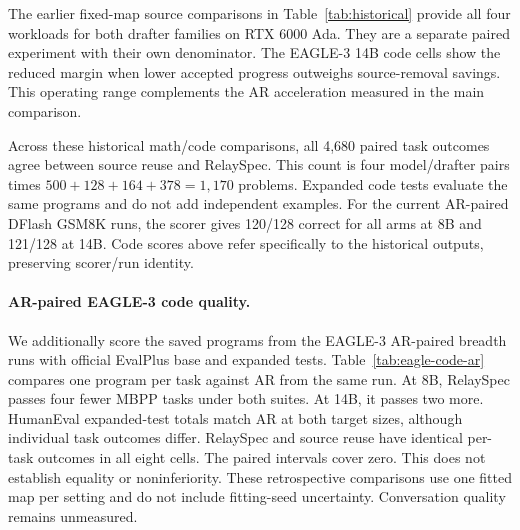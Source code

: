 \documentclass{article}
\begin{document}
\begin{table}[H]
\caption{Complete DFlash breadth comparisons with paired AR. Ratios use
end-to-end throughput. Every planned task and target cell is included.}
\label{tab:breadth-ar}
\centering\small
\setlength{\tabcolsep}{3.5pt}

\end{table}

The earlier fixed-map source comparisons in Table~\ref{tab:historical}
provide all four workloads for both drafter families on RTX 6000 Ada.
They are a separate paired experiment with their own denominator.
The EAGLE-3 14B code cells show the reduced margin when lower accepted
progress outweighs source-removal savings. This operating range complements
the AR acceleration measured in the main comparison.

\begin{table}[H]
\caption{Historical paired source-reuse breadth measurements on RTX 6000
Ada. Ratios compare relay with source throughput within these runs.
They are not normalized by an AR arm from another experiment.}
\label{tab:historical}
\centering\small
\setlength{\tabcolsep}{3.5pt}

\end{table}

\begin{table}[H]
\caption{Task scores for the historical fixed-map breadth runs.
Source reuse and RelaySpec share each reported score. Code columns are
single-program pass percentages under base and expanded EvalPlus tests.}
\label{tab:historical-quality}
\centering\small

\end{table}

Across these historical math/code comparisons, all 4,680 paired task
outcomes agree between source reuse and RelaySpec. This count is four
model/drafter pairs times $500+128+164+378=1,170$ problems. Expanded code
tests evaluate the same programs and do not add independent examples.
For the current AR-paired DFlash GSM8K runs, the scorer gives 120/128
correct for all arms at 8B and 121/128 at 14B. Code scores above refer
specifically to the historical outputs, preserving scorer/run identity.

\paragraph{AR-paired EAGLE-3 code quality.}
We additionally score the saved programs from the EAGLE-3 AR-paired
breadth runs with official EvalPlus base and expanded tests.
Table~\ref{tab:eagle-code-ar} compares one program per task against AR
from the same run. At 8B, RelaySpec passes four fewer MBPP tasks under
both suites. At 14B, it passes two more. HumanEval expanded-test totals
match AR at both target sizes, although individual task outcomes differ.
RelaySpec and source reuse have identical per-task outcomes in all eight
cells. The paired intervals cover zero. This does not establish equality
or noninferiority. These retrospective comparisons use one fitted map
per setting and do not include fitting-seed uncertainty. Conversation
quality remains unmeasured.
\end{document}
